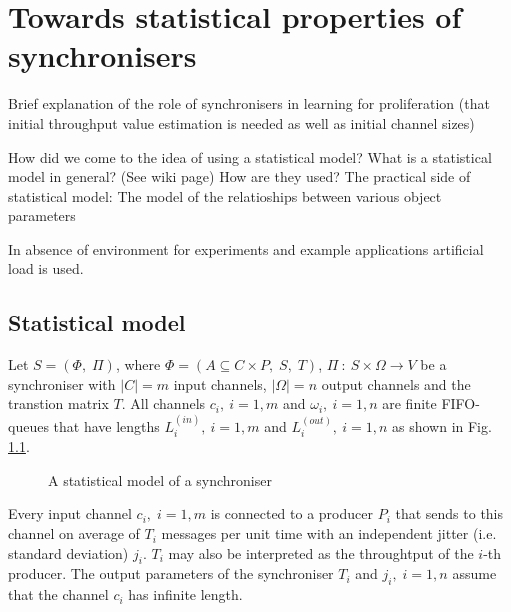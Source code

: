 \chapter{Towards statistical properties of synchronisers}
Brief explanation of the role of synchronisers in learning for proliferation (that initial throughput value estimation is needed as well as initial channel sizes)

How did we come to the idea of using a statistical model?
What is a statistical model in general? (See wiki page) How are they used?
The practical side of statistical model: The model of the relatioships between various object parameters
 
In absence of environment for experiments and example applications artificial load is used.


\section{Statistical model}
Let $S = (\Phi, \; \Pi)$, where $\Phi = (A \subseteq C \times P, \; S, \; T)$, $\Pi \: : \: S \times \Omega \to V$ be a synchroniser with $|C| = m$ input channels, $|\Omega| = n$ output channels and the transtion matrix $T$. All channels $c_{i}, \: i = 1,m$ and $\omega_{i}, \: i=1,n$ are finite FIFO-queues that have lengths $L^{(in)}_{i}, \: i = 1,m$ and $L^{(out)}_{i}, \: i=1,n$ as shown in Fig. \ref{fig:stat_mod}.

  \begin{figure}[h] %
  \scalebox{0.8}{
    
  }
  \caption{A statistical model of a synchroniser}
  \label{fig:stat_mod}
  \end{figure}

Every input channel $c_{i}, \; i = 1,m$ is connected to a producer $P_{i}$ that sends to this channel on average of $T_{i}$ messages per unit time with an independent jitter (i.e. standard deviation) $j_{i}$. $T_{i}$ may also be interpreted as the throughtput of the $i$-th producer. The output parameters of the synchroniser $T_{i}$ and $j_{i}, \; i=1,n$ assume that the channel $c_{i}$ has infinite length.

